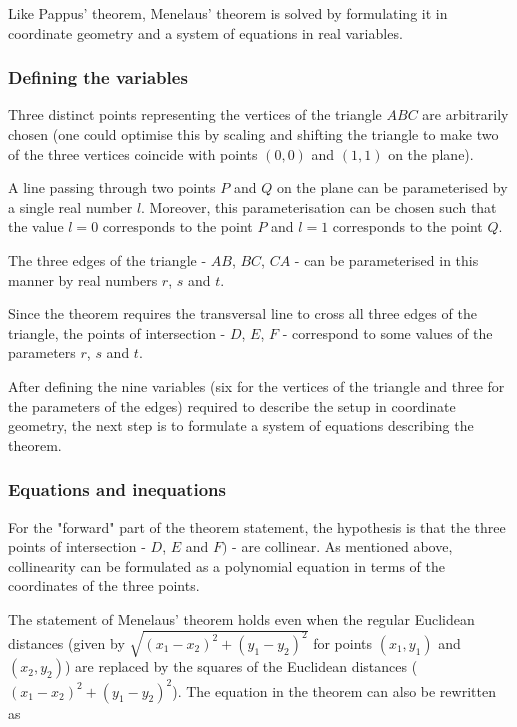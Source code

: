 \documentclass{amsart}
\theoremstyle{plain}
\theoremstyle{definition}
\theoremstyle{remark}
\begin{document}
Like Pappus' theorem, Menelaus' theorem is solved by formulating it in coordinate geometry and a system of equations in real variables.

\subsubsection{Defining the variables}

Three distinct points representing the vertices of the triangle \(ABC\) are arbitrarily chosen (one could optimise this by scaling and shifting the triangle to make two of the three vertices coincide with points \((0, 0)\) and \((1, 1)\) on the plane).

A line passing through two points \(P\) and \(Q\) on the plane can be parameterised by a single real number \(l\). Moreover, this parameterisation can be chosen such that the value \(l = 0\) corresponds to the point \(P\) and \(l = 1\) corresponds to the point \(Q\).

The three edges of the triangle - \(AB\), \(BC\), \(CA\) - can be parameterised in this manner by real numbers \(r\), \(s\) and \(t\).

Since the theorem requires the transversal line to cross all three edges of the triangle, the points of intersection - \(D\), \(E\), \(F\) - correspond to some values of the parameters \(r\), \(s\) and \(t\).

After defining the nine variables (six for the vertices of the triangle and three for the parameters of the edges) required to describe the setup in coordinate geometry, the next step is to formulate a system of equations describing the theorem.

\subsubsection{Equations and inequations}

For the "forward" part of the theorem statement, the hypothesis is that the three points of intersection - \(D\), \(E\) and \(F)\) - are collinear. As mentioned above, collinearity can be formulated as a polynomial equation in terms of the coordinates of the three points.

The statement of Menelaus' theorem holds even when the regular Euclidean distances (given by $\sqrt{(x_1 - x_2)^2 + (y_1 - y_2)^2}$ for points $(x_1, y_1)$ and $(x_2, y_2)$) are replaced by the squares of the Euclidean distances ($(x_1 - x_2)^2 + (y_1 - y_2)^2$). The equation in the theorem can also be rewritten as
\end{document}
